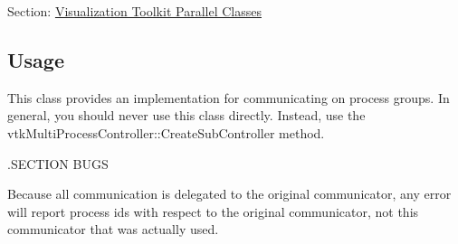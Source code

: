 Section\-: \hyperlink{sec_vtkparallel}{Visualization Toolkit Parallel Classes} \hypertarget{vtkwidgets_vtkxyplotwidget_Usage}{}\subsection{Usage}\label{vtkwidgets_vtkxyplotwidget_Usage}
This class provides an implementation for communicating on process groups. In general, you should never use this class directly. Instead, use the vtk\-Multi\-Process\-Controller\-::\-Create\-Sub\-Controller method.

.S\-E\-C\-T\-I\-O\-N B\-U\-G\-S

Because all communication is delegated to the original communicator, any error will report process ids with respect to the original communicator, not this communicator that was actually used.

